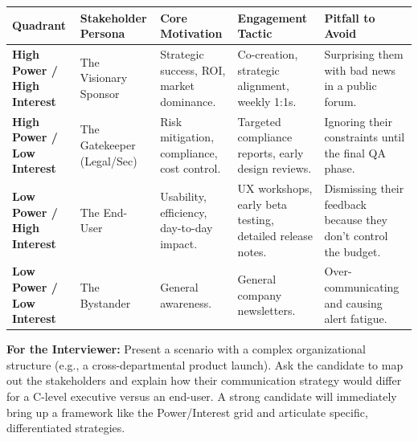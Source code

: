 \documentclass[
  11pt,
  openany,
  oneside]{book}
\renewenvironment{quote}{\begin{customquote}}{\end{customquote}}
\begin{document}
\begin{longtable}[]{@{}
  >{\raggedright\arraybackslash}p{}
  >{\raggedright\arraybackslash}p{}
  >{\raggedright\arraybackslash}p{}
  >{\raggedright\arraybackslash}p{}
  >{\raggedright\arraybackslash}p{}@{}}
\toprule\noalign{}
\begin{minipage}[b]{\linewidth}\raggedright
Quadrant
\end{minipage} & \begin{minipage}[b]{\linewidth}\raggedright
Stakeholder Persona
\end{minipage} & \begin{minipage}[b]{\linewidth}\raggedright
Core Motivation
\end{minipage} & \begin{minipage}[b]{\linewidth}\raggedright
Engagement Tactic
\end{minipage} & \begin{minipage}[b]{\linewidth}\raggedright
Pitfall to Avoid
\end{minipage} \\
\midrule\noalign{}
\endhead
\bottomrule\noalign{}
\endlastfoot
\textbf{High Power / High Interest} & The Visionary Sponsor & Strategic
success, ROI, market dominance. & Co-creation, strategic alignment,
weekly 1:1s. & Surprising them with bad news in a public forum. \\
\textbf{High Power / Low Interest} & The Gatekeeper (Legal/Sec) & Risk
mitigation, compliance, cost control. & Targeted compliance reports,
early design reviews. & Ignoring their constraints until the final QA
phase. \\
\textbf{Low Power / High Interest} & The End-User & Usability,
efficiency, day-to-day impact. & UX workshops, early beta testing,
detailed release notes. & Dismissing their feedback because they don't
control the budget. \\
\textbf{Low Power / Low Interest} & The Bystander & General awareness. &
General company newsletters. & Over-communicating and causing alert
fatigue. \\
\end{longtable}

\begin{quote}
\textbf{For the Interviewer:} Present a scenario with a complex
organizational structure (e.g., a cross-departmental product launch).
Ask the candidate to map out the stakeholders and explain how their
communication strategy would differ for a C-level executive versus an
end-user. A strong candidate will immediately bring up a framework like
the Power/Interest grid and articulate specific, differentiated
strategies.
\end{quote}
\end{document}
